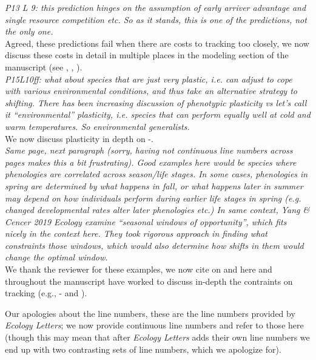 \documentclass[11pt]{article}
\begin{document}
\emph{P13 L 9: this prediction hinges on the assumption of early arriver advantage and single
resource competition etc. So as it stands, this is one of the predictions, not the only one.}\\

Agreed, these predictions fail when there are costs to tracking too closely, we now discuss these costs in detail in multiple places in the modeling section of the manuscript (see , , ).\\

\emph{P15L10ff: what about species that are just very plastic, i.e. can adjust to cope with various
environmental conditions, and thus take an alternative strategy to shifting. There has been
increasing discussion of phenotypic plasticity vs let's call it ``environmental''  plasticity,
i.e. species that can perform equally well at cold and warm temperatures. So environmental
generalists.}\\

We now discuss plasticity in depth on -. \\

\emph{Same page, next paragraph (sorry, having not continuous line numbers across pages makes this a bit frustrating). Good examples here would be species where phenologies are correlated
across season/life stages. In some cases, phenologies in spring are determined by what
happens in fall, or what happens later in summer may depend on how individuals perform during
earlier life stages in spring (e.g. changed developmental rates alter later phenologies etc.)
In same context, Yang \& Cencer 2019 Ecology examine ``seasonal windows of opportunity'', which
fits nicely in the context here. They took rigorous approach in finding what constraints
those windows, which would also determine how shifts in them would change the optimal window.}\\

We thank the reviewer for these examples, we now cite \citet{yang2020} on  and here and throughout the manuscript have worked to discuss in-depth the contraints on tracking (e.g., - and ). 

Our apologies about the line numbers, these are the line numbers provided by \emph{Ecology Letters}; we now provide continuous line numbers and refer to those here (though this may mean that after \emph{Ecology Letters} adds their own line numbers we end up with two contrasting sets of line numbers, which we apologize for).\\
\end{document}
